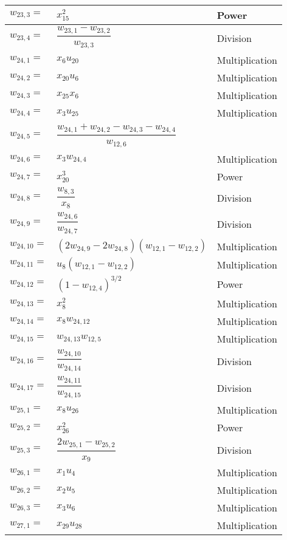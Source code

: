 \begin{longtable}{|p{1.5cm}|l|p{2cm}|}
$w_{23,3}=$ & $ x_{15}^{2} $ & Power  \\ \hline
$w_{23,4}=$ & $ \dfrac{w_{23,1}-w_{23,2}}{w_{23,3}} $ & Division \\ \hline
$w_{24,1}=$ & $ x_{6}u_{20} $ & Multiplication \\ \hline
$w_{24,2}=$ & $ x_{20}u_{6} $ & Multiplication \\ \hline
$w_{24,3}=$ & $ x_{25}x_{6} $ & Multiplication \\ \hline
$w_{24,4}=$ & $ x_{3}u_{25} $ & Multiplication \\ \hline
$w_{24,5}=$ & $ \dfrac{w_{24,1}+w_{24,2}-w_{24,3}-w_{24,4}}{w_{12,6}} $ &  \\ \hline
$w_{24,6}=$ & $ x_{3}w_{24,4} $ & Multiplication \\ \hline
$w_{24,7}=$ & $ x_{20}^{3} $ & Power \\ \hline
$w_{24,8}=$ & $ \dfrac{w_{8,3}}{x_{8}} $ & Division \\ \hline
$w_{24,9}=$ & $ \dfrac{w_{24,6}}{w_{24,7}} $ & Division \\ \hline
$w_{24,10}=$ & $ \left(2w_{24,9}-2w_{24,8}\right)\left(w_{12,1}-w_{12,2}\right) $ & Multiplication \\ \hline
$w_{24,11}=$ & $ u_{8}\left(w_{12,1}-w_{12,2}\right) $ & Multiplication \\ \hline
$w_{24,12}=$ & $ \left(1-w_{12,4}\right)^{3/2} $ & Power \\ \hline
$w_{24,13}=$ & $ x_{8}^{2} $ & Multiplication \\ \hline
$w_{24,14}=$ & $ x_{8}w_{24,12} $ & Multiplication \\ \hline
$w_{24,15}=$ & $ w_{24,13}w_{12,5} $ & Multiplication \\ \hline
$w_{24,16}=$ & $ \dfrac{w_{24,10}}{w_{24,14}} $ & Division \\ \hline
$w_{24,17}=$ & $ \dfrac{w_{24,11}}{w_{24,15}} $ & Division \\ \hline
$w_{25,1}=$ & $ x_{8}u_{26} $ & Multiplication \\ \hline
$w_{25,2}=$ & $ x_{26}^{2} $ & Power \\ \hline
$w_{25,3}=$ & $ \dfrac{2w_{25,1}-w_{25,2}}{x_{9}} $ & Division  \\ \hline
$w_{26,1}=$ & $ x_{1}u_{4} $ & Multiplication \\ \hline
$w_{26,2}=$ & $ x_{2}u_{5} $ & Multiplication \\ \hline
$w_{26,3}=$ & $ x_{3}u_{6} $ & Multiplication \\ \hline
$w_{27,1}=$ & $ x_{29}u_{28} $ & Multiplication \\ \hline

\end{longtable}
